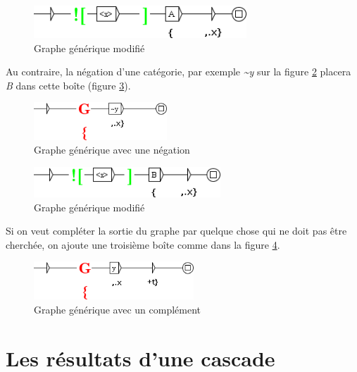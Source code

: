 \begin{figure}[!htb]
  \centering
  \includegraphics[width=8cm]{resources/img/fig12-3-04.png}
  \caption{Graphe g\'{e}n\'{e}rique modifi\'{e}}
  \label{fig12-3-04}
\end{figure}

\bigskip
\bigskip
\bigskip
\bigskip
\bigskip
\bigskip
\bigskip
\bigskip
\noindent Au contraire, la n\'{e}gation d'une cat\'{e}gorie, par exemple \textit{\textasciitilde y} sur la figure \ref{fig12-3-05} placera \textit{B} dans cette bo\^{i}te (figure \ref{fig12-3-06}).
\begin{figure}[!htb]
  \centering
  \includegraphics[width=5cm]{resources/img/fig12-3-05.png}
  \caption{Graphe g\'{e}n\'{e}rique avec une n\'{e}gation}
  \label{fig12-3-05}
\end{figure}


\begin{figure}[!htb]
  \centering
  \includegraphics[width=7cm]{resources/img/fig12-3-06.png}
  \caption{Graphe g\'{e}n\'{e}rique modifi\'{e}}
  \label{fig12-3-06}
\end{figure}

Si on veut compl\'{e}ter la sortie du graphe par quelque chose qui ne doit pas \^{e}tre cherch\'{e}e, on ajoute une troisi\`{e}me bo\^{i}te comme dans la figure \ref{fig12-3-07}.
\begin{figure}[!htb]
  \centering
  \includegraphics[width=6cm]{resources/img/fig12-3-07.png}
  \caption{Graphe g\'{e}n\'{e}rique avec un compl\'{e}ment}
  \label{fig12-3-07}
\end{figure}

\section{Les résultats d'une cascade}


